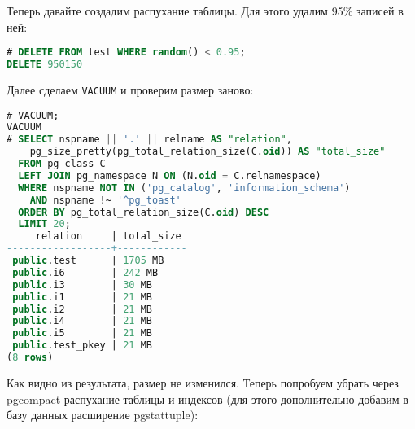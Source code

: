 Теперь давайте создадим распухание таблицы. Для этого удалим 95\% записей в ней:

\begin{lstlisting}[language=SQL,label=lst:pgcompactor6,caption=Удаляем 95\% записей]
# DELETE FROM test WHERE random() < 0.95;
DELETE 950150
\end{lstlisting}

Далее сделаем \lstinline!VACUUM! и проверим размер заново:

\begin{lstlisting}[language=SQL,label=lst:pgcompactor7,caption=Размер таблицы и индексов]
# VACUUM;
VACUUM
# SELECT nspname || '.' || relname AS "relation",
    pg_size_pretty(pg_total_relation_size(C.oid)) AS "total_size"
  FROM pg_class C
  LEFT JOIN pg_namespace N ON (N.oid = C.relnamespace)
  WHERE nspname NOT IN ('pg_catalog', 'information_schema')
    AND nspname !~ '^pg_toast'
  ORDER BY pg_total_relation_size(C.oid) DESC
  LIMIT 20;
     relation     | total_size
------------------+------------
 public.test      | 1705 MB
 public.i6        | 242 MB
 public.i3        | 30 MB
 public.i1        | 21 MB
 public.i2        | 21 MB
 public.i4        | 21 MB
 public.i5        | 21 MB
 public.test_pkey | 21 MB
(8 rows)
\end{lstlisting}

Как видно из результата, размер не изменился. Теперь попробуем убрать через pgcompact распухание таблицы и индексов (для этого дополнительно добавим в базу данных расширение pgstattuple):

